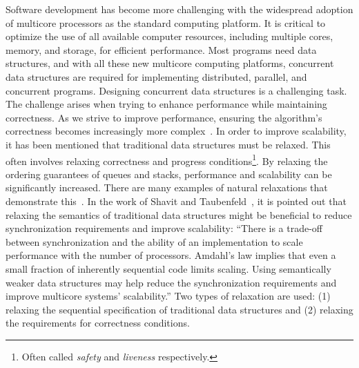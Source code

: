 Software development has become more challenging with the widespread adoption of multicore processors as the standard computing platform. It is critical to optimize the use of all available computer resources, including multiple cores, memory, and storage, for efficient performance. Most programs need data structures, and with all these new multicore computing platforms, concurrent data structures are required for implementing distributed, parallel, and concurrent programs. Designing concurrent data structures is a challenging task. The challenge arises when trying to enhance performance while maintaining correctness. As we strive to improve performance, ensuring the algorithm's correctness becomes increasingly more complex~\cite{DBLP_journals_cacm_Shavit11}. In order to improve scalability, it has been mentioned that traditional data structures must be relaxed. This often involves relaxing correctness and progress conditions\footnote{Often called \textit{safety} and \textit{liveness} respectively.}. By relaxing the ordering guarantees of queues and stacks, performance and scalability can be significantly increased. There are many examples of natural relaxations that demonstrate this~\cite{DBLP_journals_cacm_Shavit11}. In the work of Shavit and Taubenfeld~\cite{DBLP_journals_dc_ShavitT16}, it is pointed out that relaxing the semantics of traditional data structures might be beneficial to reduce synchronization requirements and improve scalability: ``There is a trade-off between synchronization and the ability of an implementation to scale performance with the number of processors. Amdahl’s law implies that even a small fraction of inherently sequential code limits scaling. Using semantically weaker data structures may help reduce the synchronization requirements and improve multicore systems' scalability.''
Two types of relaxation are used: (1) relaxing the sequential specification of traditional data structures and (2) relaxing the requirements for correctness conditions.

